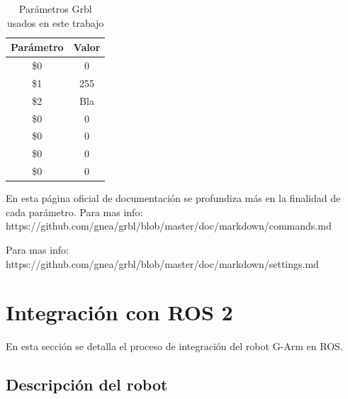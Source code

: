\begin{table}[H]
\begin{center}
\begin{tabular}{|c|c|}
\hline
\textbf{Parámetro} & \textbf{Valor} \\
\hline
\$0 & 0 \\
\$1 & 255 \\
\$2 & Bla \\
\$0 & 0 \\
\$0 & 0 \\
\$0 & 0 \\
\$0 & 0 \\

\end{tabular}
\caption{Parámetros Grbl usados en este trabajo}
\label{cuadro:parametros_grbl}
\end{center}
\end{table}

En esta página oficial de documentación se profundiza más en la finalidad de cada parámetro.
Para mas info: https://github.com/gnea/grbl/blob/master/doc/markdown/commands.md

Para mas info: https://github.com/gnea/grbl/blob/master/doc/markdown/settings.md


\newpage
\section{Integración con ROS 2}
En esta sección se detalla el proceso de integración del robot G-Arm en \acs{ROS}.

\subsection{Descripción del robot}

